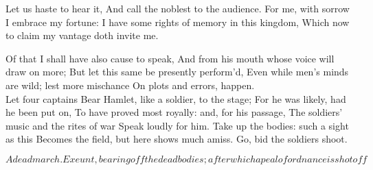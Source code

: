 \documentclass[11pt]{book}
\begin{document}
	            Let us haste to hear it,
	And call the noblest to the audience.
	For me, with sorrow I embrace my fortune:
	I have some rights of memory in this kingdom,
	Which now to claim my vantage doth invite me.

\6	Of that I shall have also cause to speak,
	And from his mouth whose voice will draw on more;
	But let this same be presently perform'd,
	Even while men's minds are wild; lest more mischance
	On plots and errors, happen. \\

	Let four captains
	Bear Hamlet, like a soldier, to the stage;
	For he was likely, had he been put on,
	To have proved most royally: and, for his passage,
	The soldiers' music and the rites of war
	Speak loudly for him.
	Take up the bodies: such a sight as this
	Becomes the field, but here shows much amiss.
	Go, bid the soldiers shoot.

	\(A dead march. Exeunt, bearing off the dead
	bodies; after which a peal of ordnance is shot off\)

\endVersus
\endDrama
\end{document}
